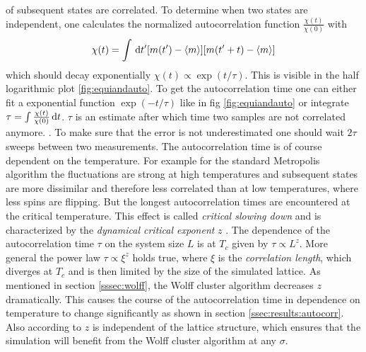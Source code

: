         of subsequent states are correlated. To determine when two states
        are independent, one calculates the normalized autocorrelation function
        \(\frac{\chi(t)}{\chi(0)}\) with
        \begin{equation}
            \chi(t) = \int \,\mathrm{d} t' [m(t') -\left< m \right>][m(t'+t)-\left< m \right>]
        \end{equation}
        which should decay exponentially
        \(\chi(t) \propto \exp(t/\tau)\). This is visible in the half
        logarithmic plot \ref{fig:equiandauto}.
        To get the autocorrelation time one can either fit a exponential
        function \(\exp(-t/\tau)\) like in fig \ref{fig:equiandauto}
        or integrate \(\tau = \int \frac{\chi(t)}{\chi(0)} \,\mathrm{d} t\).
        \(\tau\) is an estimate after which time two samples are not
        correlated anymore. \cite[S. ??]{NewmanBarkema1999} \cite[S. 150f]{Katzgraber2011}.
        To make sure that the error is not underestimated one should wait
        \(2\tau\) sweeps between two measurements.
        The autocorrelation time is of course dependent on the temperature.
        For example for the standard Metropolis algorithm the fluctuations
        are strong at high temperatures and subsequent
        states are more dissimilar and therefore less correlated than at low
        temperatures, where less spins are flipping. But the longest
        autocorrelation times are encountered at the critical temperature.
        This effect is called \emph{critical slowing down} and is
        characterized by the \emph{dynamical critical exponent} \(z\)
        \cite{SwendsenWang1987}. The dependence of the autocorrelation time
        \(\tau\) on the system size \(L\) is at \(T_{c}\) given by \(\tau \propto L^z\).
        More general the power law \(\tau \propto \xi^z\) holds true, where
        \(\xi\) is the \emph{correlation length}, which diverges at
        \(T_{c}\) and is then limited by the size of the simulated lattice.
        As mentioned in section \ref{sssec:wolff}, the Wolff cluster algorithm
        decreases \(z\) dramatically. This causes the course of the autocorrelation
        time in dependence on temperature to change significantly as shown in
        section \ref{ssec:results:autocorr}. Also according to \cite{NewmanBarkema1999}
        \(z\) is independent of the lattice structure, which ensures that
        the simulation will benefit from the Wolff cluster algorithm at
        any \(\sigma\).
